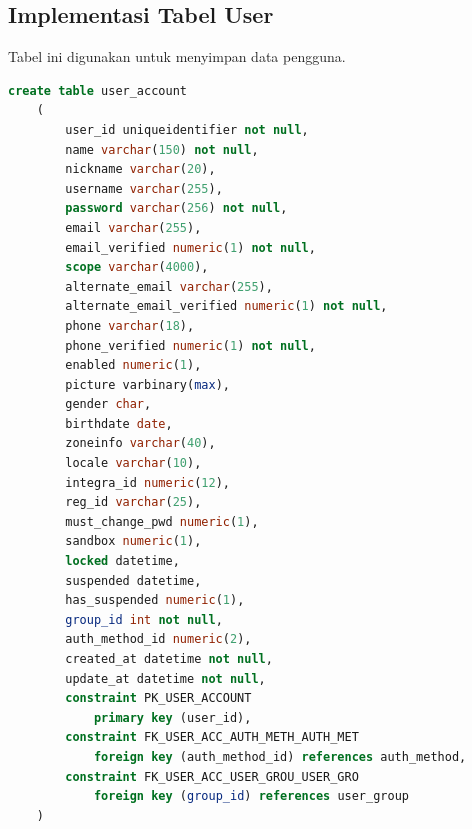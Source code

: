 \subsection{Implementasi Tabel User}
\par Tabel ini digunakan untuk menyimpan data pengguna.
\begin{lstlisting}[language=sql, firstnumber=1, caption=Implementasi Tabel User]
    create table user_account
    (
        user_id uniqueidentifier not null,
        name varchar(150) not null,
        nickname varchar(20),
        username varchar(255),
        password varchar(256) not null,
        email varchar(255),
        email_verified numeric(1) not null,
        scope varchar(4000),
        alternate_email varchar(255),
        alternate_email_verified numeric(1) not null,
        phone varchar(18),
        phone_verified numeric(1) not null,
        enabled numeric(1),
        picture varbinary(max),
        gender char,
        birthdate date,
        zoneinfo varchar(40),
        locale varchar(10),
        integra_id numeric(12),
        reg_id varchar(25),
        must_change_pwd numeric(1),
        sandbox numeric(1),
        locked datetime,
        suspended datetime,
        has_suspended numeric(1),
        group_id int not null,
        auth_method_id numeric(2),
        created_at datetime not null,
        update_at datetime not null,
        constraint PK_USER_ACCOUNT
            primary key (user_id),
        constraint FK_USER_ACC_AUTH_METH_AUTH_MET
            foreign key (auth_method_id) references auth_method,
        constraint FK_USER_ACC_USER_GROU_USER_GRO
            foreign key (group_id) references user_group
    )
\end{lstlisting}
